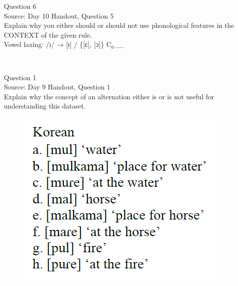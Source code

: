 \documentclass[12pt]{article}
\begin{document}
\newpage

{\large Question 6}\\

Source: Day 10 Handout, Question 5\\

Explain why you either should or should not use phonological features in the CONTEXT of the given rule.\\

Vowel laxing: /i/ → {[ɪ]} / \{{[ɛ]}, {[ɔ]}\} C$_0$\_\_


\newpage

\begin{center}
\textbf{{\color{red}{\HUGE END OF EXAM}}}\\

\end{center}
\newpage

\begin{center}
\textbf{{\color{blue}{\HUGE START OF EXAM\\}}}

\textbf{{\color{blue}{\HUGE Student ID: 9918\\}}}

\textbf{{\color{blue}{\HUGE 4:20 - 4:40 PM\\}}}

\end{center}
\newpage

{\large Question 1}\\

Source: Day 9 Handout, Question 1\\

Explain why the concept of an alternation either is or is not useful for understanding this dataset.\\

\begin{figure}[H]
\includegraphics{../images/korean.png}
\end{figure}
\end{document}
